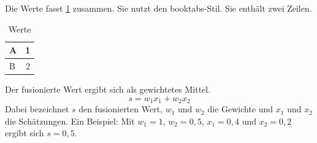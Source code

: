Die Werte fasst \cref{tab:sauber} zusammen.
Sie nutzt den booktabs-Stil.
Sie enthält zwei Zeilen.

\begin{table}[htbp]
    \centering
    \caption{Werte}
    \label{tab:sauber}
    \begin{tabular}{lr}
        \toprule
        A & 1 \\
        \midrule
        B & 2 \\
        \bottomrule
    \end{tabular}
\end{table}

Der fusionierte Wert ergibt sich als gewichtetes Mittel.
\begin{equation}
    s = w_1 x_1 + w_2 x_2
\end{equation}
Dabei bezeichnet $s$ den fusionierten Wert, $w_1$ und $w_2$ die Gewichte und $x_1$ und $x_2$ die Schätzungen.
Ein Beispiel: Mit $w_1 = 1$, $w_2 = 0{,}5$, $x_1 = 0{,}4$ und $x_2 = 0{,}2$ ergibt sich $s = 0{,}5$.
